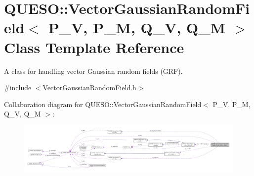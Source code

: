 \hypertarget{class_q_u_e_s_o_1_1_vector_gaussian_random_field}{\section{Q\-U\-E\-S\-O\-:\-:Vector\-Gaussian\-Random\-Field$<$ P\-\_\-\-V, P\-\_\-\-M, Q\-\_\-\-V, Q\-\_\-\-M $>$ Class Template Reference}
\label{class_q_u_e_s_o_1_1_vector_gaussian_random_field}
}


A class for handling vector Gaussian random fields (G\-R\-F).  




{\ttfamily \#include $<$Vector\-Gaussian\-Random\-Field.\-h$>$}



Collaboration diagram for Q\-U\-E\-S\-O\-:\-:Vector\-Gaussian\-Random\-Field$<$ P\-\_\-\-V, P\-\_\-\-M, Q\-\_\-\-V, Q\-\_\-\-M $>$\-:
\nopagebreak
\begin{figure}[H]
\begin{center}
\leavevmode
\includegraphics[width=350pt]{class_q_u_e_s_o_1_1_vector_gaussian_random_field__coll__graph}
\end{center}
\end{figure}
